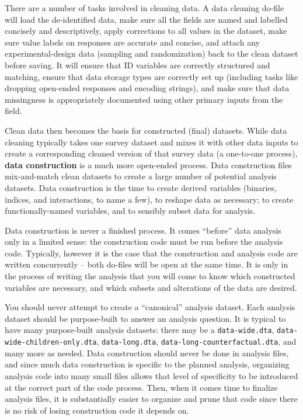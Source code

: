 There are a number of tasks involved in cleaning data.
A data cleaning do-file will load the de-identified data,
make sure all the fields are named and labelled concisely and descriptively,
apply corrections to all values in the dataset,
make sure value labels on responses are accurate and concise,
and attach any experimental-design data (sampling and randomization)
back to the clean dataset before saving.
It will ensure that ID variables are correctly structured and matching,
ensure that data storage types are correctly set up
(including tasks like dropping open-ended responses and encoding strings),
and make sure that data missingness is appropriately documented
using other primary inputs from the field.

Clean data then becomes the basis for constructed (final) datasets.
While data cleaning typically takes one survey dataset
and mixes it with other data inputs to create a corresponding
cleaned version of that survey data (a one-to-one process),
\textbf{data construction} is a much more open-ended process.
Data construction files mix-and-match clean datasets
to create a large number of potential analysis datasets.
Data construction is the time to create derived variables
(binaries, indices, and interactions, to name a few),
to reshape data as necessary;
to create functionally-named variables,
and to sensibly subset data for analysis.

Data construction is never a finished process.
It comes ``before'' data analysis only in a limited sense:
the construction code must be run before the analysis code.
Typically, however it is the case that the construction and analysis code
are written concurrently -- both do-files will be open at the same time.
It is only in the process of writing the analysis
that you will come to know which constructed variables are necessary,
and which subsets and alterations of the data are desired.

You should never attempt to create a ``canonical'' analysis dataset.
Each analysis dataset should be purpose-built to answer an analysis question.
It is typical to have many purpose-built analysis datasets:
there may be a \texttt{data-wide.dta},
\texttt{data-wide-children-only.dta}, \texttt{data-long.dta},
\texttt{data-long-counterfactual.dta}, and many more as needed.
Data construction should never be done in analysis files,
and since much data construction is specific to the planned analysis,
organizing analysis code into many small files allows that level of specificity
to be introduced at the correct part of the code process.
Then, when it comes time to finalize analysis files,
it is substantially easier to organize and prune that code
since there is no risk of losing construction code it depends on.

